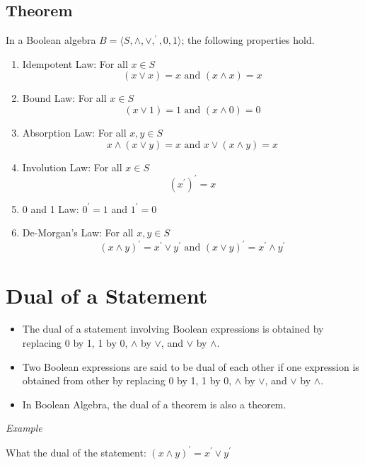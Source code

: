 \documentclass[]{book}
\providecommand{\tightlist}{%
  \setlength{\itemsep}{0pt}\setlength{\parskip}{0pt}}
\begin{document}
\hypertarget{theorem-2}{%
\subsection{Theorem}\label{theorem-2}}

In a Boolean algebra \(B = \langle S, \land, \lor, ^\prime, 0,1\rangle\); the following properties hold.

\begin{enumerate}
\def\labelenumi{(\alph{enumi})}
\tightlist
\item
  Idempotent Law: For all \(x \in S\)
  \[(x \lor x) =x \text{ and } (x \land x) =x\]
\item
  Bound Law: For all \(x \in S\)
  \[(x \lor 1) =1 \text{ and } (x \land 0) =0\]
\item
  Absorption Law: For all \(x,y \in S\)
  \[x \land (x\lor y) =x \text{ and } x \lor (x \land y) =x \]
\item
  Involution Law: For all \(x \in S\)
  \[(x^\prime)^\prime  =x \]
\item
  0 and 1 Law: \(0^\prime =1\) and \(1^\prime =0\)
\item
  De-Morgan's Law: For all \(x, y \in S\)
  \[(x \land y)^\prime = x^\prime \lor y^\prime  \text{ and }  (x \lor y)^\prime = x^\prime \land y^\prime \]
\end{enumerate}

\hypertarget{dual-of-a-statement}{%
\section{Dual of a Statement}\label{dual-of-a-statement}}

\begin{itemize}
\tightlist
\item
  The dual of a statement involving Boolean expressions is obtained by replacing 0 by 1, 1 by 0, \(\land\) by \(\lor\), and \(\lor\) by \(\land\).
\item
  Two Boolean expressions are said to be dual of each other if one expression is obtained from other by replacing 0 by 1, 1 by 0, \(\land\) by \(\lor\), and \(\lor\) by \(\land\).
\item
  In Boolean Algebra, the dual of a theorem is also a theorem.
\end{itemize}

\emph{Example}

What the dual of the statement: \((x \land y)^\prime = x^\prime \lor y^\prime\)
\end{document}
